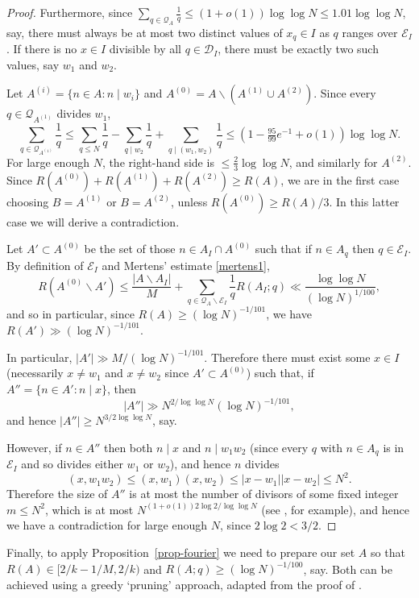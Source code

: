 \documentclass[12pt]{amsart}
\newcommand{\abs}[1]{\left\lvert #1\right\rvert}
\begin{document}
\begin{proof}
Furthermore, since $\sum_{q\in\mathcal{Q}_A}\frac{1}{q}\leq (1+o(1))\log\log N\leq 1.01\log\log N$, say, there must always be at most two distinct values of $x_q\in I$ as $q$ ranges over $\mathcal{E}_I$. If there is no $x\in I$ divisible by all $q\in\mathcal{D}_I$, there must be exactly two such values, say $w_1$ and $w_2$. 

Let $A^{(i)}=\{n\in A: n\mid w_i\}$ and $A^{(0)}=A\backslash (A^{(1)}\cup A^{(2)})$. Since every $q\in\mathcal{Q}_{A^{(1)}}$ divides $w_1$, 
\[\sum_{q\in \mathcal{Q}_{A^{(1)}}}\frac{1}{q}\leq \sum_{q\leq N}\frac{1}{q}- \sum_{q\mid w_2}\frac{1}{q}+ \sum_{q\mid (w_1,w_2)}\frac{1}{q}\leq (1-\tfrac{95}{99}e^{-1}+o(1))\log\log N.\]
For large enough $N$, the right-hand side is $\leq \frac{2}{3}\log\log N$, and similarly for $A^{(2)}$. Since $R(A^{(0)})+R(A^{(1)})+R(A^{(2)})\geq R(A)$, we are in the first case choosing $B=A^{(1)}$ or $B=A^{(2)}$, unless $R(A^{(0)})\geq R(A)/3$. In this latter case we will derive a contradiction.

Let $A'\subset A^{(0)}$ be the set of those $n\in A_I\cap A^{(0)}$ such that if $n\in A_q$ then $q\in\mathcal{E}_I$. By definition of $\mathcal{E}_I$ and Mertens' estimate \eqref{mertens1}, 
\[R(A^{(0)}\backslash A')\leq \frac{\abs{A\backslash A_I}}{M}+\sum_{q\in\mathcal{Q}_A\backslash \mathcal{E}_I}\frac{1}{q}R(A_I;q)\ll \frac{\log\log N}{(\log N)^{1/100}},\]
and so  in particular, since $R(A)\geq (\log N)^{-1/101}$, we have $R(A')\gg (\log N)^{-1/101}$.

In particular, $\abs{A'}\gg M/(\log N)^{-1/101}$. Therefore there must exist some $x\in I$ (necessarily $x\neq w_1$ and $x\neq w_2$ since $A'\subset A^{(0)}$) such that, if $A''=\{ n\in A' : n\mid x\}$, then
\[\abs{A''}\gg N^{2/\log\log N}(\log N)^{-1/101},\]
and hence $\abs{A''}\geq N^{3/2\log\log N}$, say. 

However, if $n\in A''$ then both $n\mid x$ and $n\mid w_1w_2$ (since every $q$ with $n\in A_q$ is in $\mathcal{E}_I$ and so divides either $w_1$ or $w_2$), and hence $n$ divides
\[(x,w_1w_2)\leq (x,w_1)(x,w_2)\leq \abs{x-w_1}\abs{x-w_2}\leq N^2.\]
Therefore the size of $A''$ is at most the number of divisors of some fixed integer $m\leq N^2$, which is at most $N^{(1+o(1))2\log 2/\log\log N}$ (see \cite[Theorem 2.11]{MV}, for example), and hence we have a contradiction for large enough $N$, since $2\log 2< 3/2$.
\end{proof}

Finally, to apply Proposition~\ref{prop-fourier} we need to prepare our set $A$ so that $R(A)\in [2/k-1/M,2/k)$ and $R(A;q)\geq (\log N)^{-1/100}$, say. Both can be achieved using a greedy `pruning' approach, adapted from the proof of \cite[Proposition 2]{Cr2003}.
\end{document}
